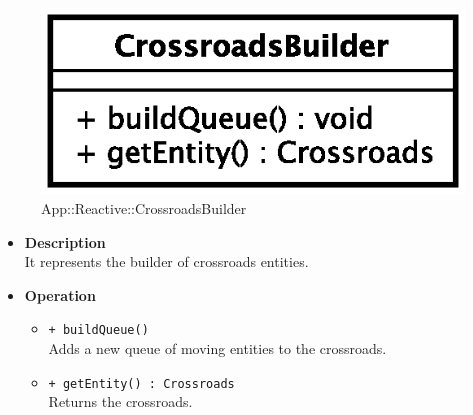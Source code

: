 \begin{figure}[h]
\centering
\includegraphics[scale=0.6,keepaspectratio]{images/solution/crossroads_builder.eps}
\caption{App::Reactive::CrossroadsBuilder}
\label{fig:sd-app-crossroads_builder}
\end{figure}
\FloatBarrier
\begin{itemize}
  \item \textbf{Description} \\
    It represents the builder of crossroads entities. 
  \item \textbf{Operation}
  \begin{itemize} 
    \item \texttt{+ buildQueue()} \\
Adds a new queue of moving entities to the crossroads.
    \item \texttt{+ getEntity() : Crossroads} \\
Returns the crossroads.
  \end{itemize}
\end{itemize}
